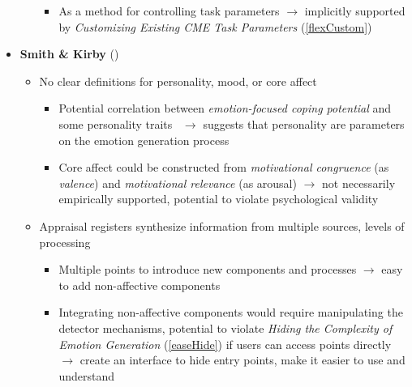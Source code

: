 \begin{itemize}
\begin{itemize}
\begin{itemize}
            \item As a method for controlling task parameters $\rightarrow$
            implicitly supported by \textit{Customizing Existing CME Task
                Parameters} (\ref{flexCustom})
        \end{itemize}
    \end{itemize}

    \item \textbf{Smith \& Kirby} (\weak)
    \begin{itemize}
        \item No clear definitions for personality, mood, or core affect
        \begin{itemize}
            \item Potential correlation between \textit{emotion-focused coping
                potential} and some personality traits~\citep[p.~1366--1368,
            1369]{smith2009putting} $\rightarrow$ suggests that personality are
            parameters on the emotion generation process

            \item Core affect could be constructed from \textit{motivational
                congruence} (as \textit{valence}) and \textit{motivational
                relevance}
            (as arousal) $\rightarrow$ not necessarily empirically
            supported, potential to violate psychological validity
        \end{itemize}

        \item Appraisal registers synthesize information from multiple sources,
        levels of processing~\citep[p.~130]{smith2001toward}
        \begin{itemize}
            \item Multiple points to introduce new components and processes
            $\rightarrow$ easy to add non-affective components

            \item Integrating non-affective components would require
            manipulating the detector mechanisms, potential to violate
            \textit{Hiding the Complexity of Emotion Generation}
            (\ref{easeHide}) if users can access points directly $\rightarrow$
            create an interface to hide entry points, make it easier to use and
            understand
        \end{itemize}
    \end{itemize}


\end{itemize}
